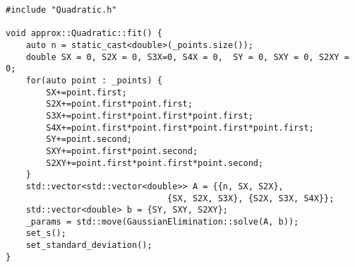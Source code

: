 \begin{lstlisting}
#include "Quadratic.h"

void approx::Quadratic::fit() {
    auto n = static_cast<double>(_points.size());
    double SX = 0, S2X = 0, S3X=0, S4X = 0,  SY = 0, SXY = 0, S2XY = 0;
    for(auto point : _points) {
        SX+=point.first;
        S2X+=point.first*point.first;
        S3X+=point.first*point.first*point.first;
        S4X+=point.first*point.first*point.first*point.first;
        SY+=point.second;
        SXY+=point.first*point.second;
        S2XY+=point.first*point.first*point.second;
    }
    std::vector<std::vector<double>> A = {{n, SX, S2X},
                                {SX, S2X, S3X}, {S2X, S3X, S4X}};
    std::vector<double> b = {SY, SXY, S2XY};
    _params = std::move(GaussianElimination::solve(A, b));
    set_s();
    set_standard_deviation();
}

\end{lstlisting}